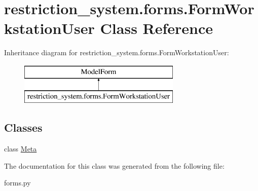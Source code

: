 \hypertarget{classrestriction__system_1_1forms_1_1FormWorkstationUser}{}\section{restriction\+\_\+system.\+forms.\+Form\+Workstation\+User Class Reference}
\label{classrestriction__system_1_1forms_1_1FormWorkstationUser}
Inheritance diagram for restriction\+\_\+system.\+forms.\+Form\+Workstation\+User\+:\begin{figure}[H]
\begin{center}
\leavevmode
\includegraphics[height=2.000000cm]{classrestriction__system_1_1forms_1_1FormWorkstationUser}
\end{center}
\end{figure}
\subsection*{Classes}
\begin{DoxyCompactItemize}
\item 
class \hyperlink{classrestriction__system_1_1forms_1_1FormWorkstationUser_1_1Meta}{Meta}
\end{DoxyCompactItemize}


The documentation for this class was generated from the following file\+:\begin{DoxyCompactItemize}
\item 
forms.\+py\end{DoxyCompactItemize}
